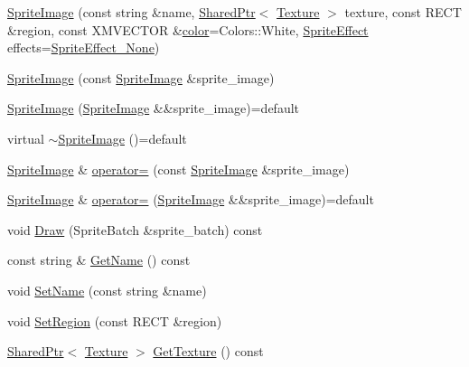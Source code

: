 \begin{DoxyCompactItemize}
\item 
\hyperlink{classmage_1_1_sprite_image_a189d4bc37642c13805f0efc1423d02c1}{Sprite\+Image} (const string \&name, \hyperlink{namespacemage_a1e01ae66713838a7a67d30e44c67703e}{Shared\+Ptr}$<$ \hyperlink{classmage_1_1_texture}{Texture} $>$ texture, const R\+E\+CT \&region, const X\+M\+V\+E\+C\+T\+OR \&\hyperlink{namespacemage_a56eceea5a9bceb2b56073f3ea4945781}{color}=Colors\+::\+White, \hyperlink{namespacemage_a9cfe18123066ba4236f548f9de75d881}{Sprite\+Effect} effects=\hyperlink{namespacemage_a9cfe18123066ba4236f548f9de75d881af3c275fbfacfe174da928b2f24dfa515}{Sprite\+Effect\+\_\+\+None})
\item 
\hyperlink{classmage_1_1_sprite_image_a7ce3b568dc3ff96e7467a8d00bba997d}{Sprite\+Image} (const \hyperlink{classmage_1_1_sprite_image}{Sprite\+Image} \&sprite\+\_\+image)
\item 
\hyperlink{classmage_1_1_sprite_image_aa8e053469bd4032560c315e9f2a7c14b}{Sprite\+Image} (\hyperlink{classmage_1_1_sprite_image}{Sprite\+Image} \&\&sprite\+\_\+image)=default
\item 
virtual \hyperlink{classmage_1_1_sprite_image_ac5e53addd73b174c6b23d3f0d63260c1}{$\sim$\+Sprite\+Image} ()=default
\item 
\hyperlink{classmage_1_1_sprite_image}{Sprite\+Image} \& \hyperlink{classmage_1_1_sprite_image_a67d97b92e93059eadaf4bd22447e0be9}{operator=} (const \hyperlink{classmage_1_1_sprite_image}{Sprite\+Image} \&sprite\+\_\+image)
\item 
\hyperlink{classmage_1_1_sprite_image}{Sprite\+Image} \& \hyperlink{classmage_1_1_sprite_image_ac30edc4a29f41ad83f341a140335ddde}{operator=} (\hyperlink{classmage_1_1_sprite_image}{Sprite\+Image} \&\&sprite\+\_\+image)=default
\item 
void \hyperlink{classmage_1_1_sprite_image_ae30d3293931f674fea17008063755bb6}{Draw} (Sprite\+Batch \&sprite\+\_\+batch) const
\item 
const string \& \hyperlink{classmage_1_1_sprite_image_a916f6afbb6d48b1feb4dd80740b7ce08}{Get\+Name} () const
\item 
void \hyperlink{classmage_1_1_sprite_image_a86416c5cdc54d90d7ffa08f8b00dc254}{Set\+Name} (const string \&name)
\item 
void \hyperlink{classmage_1_1_sprite_image_a20b1e451e3948a2ce6205ae6119d4531}{Set\+Region} (const R\+E\+CT \&region)
\item 
\hyperlink{namespacemage_a1e01ae66713838a7a67d30e44c67703e}{Shared\+Ptr}$<$ \hyperlink{classmage_1_1_texture}{Texture} $>$ \hyperlink{classmage_1_1_sprite_image_a3c04fb68baaf44e4ee8beb08aff26f35}{Get\+Texture} () const

\end{DoxyCompactItemize}

